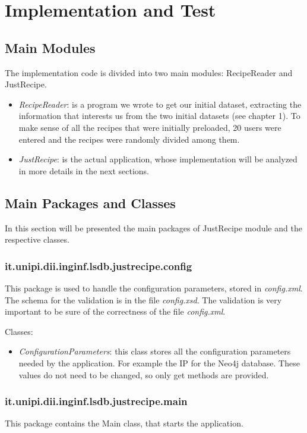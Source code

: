 \documentclass[a4paper]{report}
\begin{document}
\chapter{Implementation and Test}
\section{Main Modules}
The implementation code is divided into two main modules: RecipeReader and JustRecipe.
 \begin{itemize}
	\item \emph{RecipeReader}:  is a program we wrote to get our initial dataset, extracting the information that interests us from the two initial datasets (see chapter 1). To make sense of all the recipes that were initially preloaded, 20 users were entered and the recipes were randomly divided among them.
	\item \emph{JustRecipe}:  is the actual application, whose implementation will be analyzed in more details in the next sections. 
\end{itemize}
\section{Main Packages and Classes}
In this section will be presented the main packages of JustRecipe module and the respective classes.
\subsection {it.unipi.dii.inginf.lsdb.justrecipe.config}
This package is used to handle the configuration parameters, stored in \emph{config.xml}. The schema for the validation is in the file \emph{config.xsd}. The validation is very important to be sure of the correctness of the file \emph{config.xml}.

\noindent Classes:
 \begin{itemize}
	\item \emph{ConfigurationParameters}: this class stores all the configuration parameters needed by the application. For example the IP for the Neo4j database. These values do not need to be changed, so only get methods are provided. 
\end{itemize}
\subsection {it.unipi.dii.inginf.lsdb.justrecipe.main}
This package contains the Main class, that starts the application.
\end{document}
